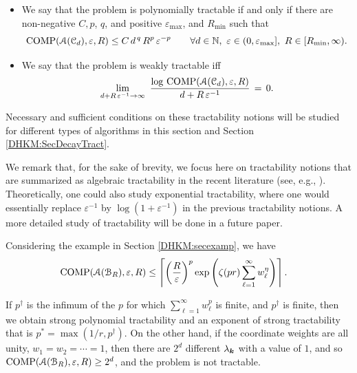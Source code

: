 \documentclass[USenglish]{article}
\theoremstyle{dgthm}
\theoremstyle{dgthm}
\theoremstyle{dgthm}
\theoremstyle{dgthm}
\theoremstyle{dgdef}
\theoremstyle{definition}
\DeclareMathOperator{\COMP}{COMP}
\begin{document}
{\begin{itemize}
\item    
We say that the problem is polynomially tractable
if and only if there are non-negative $C,p$, $q$, and positive $\varepsilon_{\max}$, and $R_{\min}$ such that   
$$   
\COMP(\calA(\calC_d), \varepsilon,R)\le C\,d^{\,q}\,R^p\,   
\varepsilon^{-p}\qquad \forall d\in\NN,\ \varepsilon \in (0, \varepsilon_{\max}], \ R \in [R_{\min}, \infty).  
$$   
\vskip 0.5pc     

   
\item   
We say that the problem is weakly tractable iff    
$$   
\lim_{d+R\,\varepsilon^{-1}\to\infty}\   
\frac{\log\, \COMP(\calA(\calC_d), \varepsilon,R)}   
{d+R\,\varepsilon^{-1}}\,=\,0.   
$$    
\end{itemize}   

Necessary and sufficient conditions on these tractability notions will be studied 
for different types of algorithms in this section and Section \ref{DHKM:SecDecayTract}. 

We remark that, for the sake of brevity, we focus here on tractability notions that are summarized as 
algebraic tractability in the recent literature 
(see, e.g., \cite{KriWoz19}). Theoretically, one could also study exponential tractability, where 
one would essentially replace $\varepsilon^{-1}$ 
by $\log (1 + \varepsilon^{-1})$ in the previous tractability notions. A more detailed study of 
tractability will be done in a future paper.

Considering the example in Section \ref{DHKM:secexamp}, we have
\begin{align*}
    \MoveEqLeft{\COMP(\calA(\calB_{R}),\varepsilon,R)} 
  \le \left \lceil \left( \frac{R}{\varepsilon} \right)^{p}  \exp\left(\zeta(p r) \sum_{\ell = 1}^{\infty} w_\ell^{\eta} \right) \right \rceil .
\end{align*}

If $p^\dagger$ is the infimum of the $p$ for which $\sum_{\ell = 1}^{\infty} w_\ell^{p}$ is finite, and $p^\dagger$ is finite, then we obtain strong polynomial tractability and an exponent of strong tractability that is $p^* = \max(1/r,p^\dagger)$. On the other hand, if the coordinate weights are all unity,  $w_1 = w_2 = \cdots = 1$, then there are $2^d$ different $\lambda_{{\boldsymbol{k}}}$ with a value of $1$, and so $\COMP(\calA(\calB_{R}),\varepsilon,R) \ge 2^d$, and the problem is not tractable.\\

}
\end{document}
